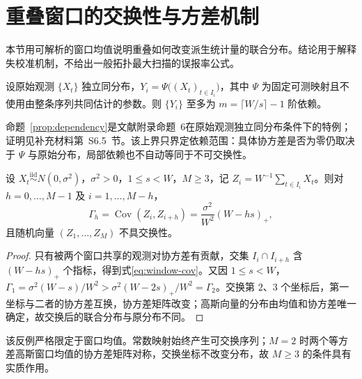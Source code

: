 \section{重叠窗口的交换性与方差机制}\label{sec:theory}

本节用可解析的窗口均值说明重叠如何改变派生统计量的联合分布。结论用于解释失校准机制，不给出一般拓扑最大扫描的误报率公式。

\begin{proposition}[局部映射的有限依赖范围]\label{prop:dependency}
设原始观测 $\{X_t\}$ 独立同分布，$Y_i=\Psi\bigl((X_t)_{t\in I_i}\bigr)$，其中 $\Psi$ 为固定可测映射且不使用由整条序列共同估计的参数。则 $\{Y_i\}$ 至多为 $m=\lceil W/s\rceil-1$ 阶依赖。
\end{proposition}

命题~\ref{prop:dependency}是文献\cite{NieYue2026}附录命题~6在原始观测独立同分布条件下的特例；证明见补充材料第~S6.5~节。该上界只界定依赖范围：具体协方差是否为零仍取决于 $\Psi$ 与原始分布，局部依赖也不自动等同于不可交换性。

\begin{proposition}[高斯窗口均值的非交换性]\label{prop:counterexample}
设 $X_t\overset{\mathrm{iid}}{\sim}N(0,\sigma^2)$，$\sigma^2>0$，$1\le s<W$，$M\ge3$，记 $Z_i=W^{-1}\sum_{t\in I_i}X_t$。则对 $h=0,\ldots,M-1$ 及 $i=1,\ldots,M-h$，
\begin{equation}\label{eq:window-cov}
 \Gamma_h=\operatorname{Cov}(Z_i,Z_{i+h})
 =\frac{\sigma^2}{W^2}(W-hs)_+ ,
\end{equation}
且随机向量 $(Z_1,\ldots,Z_M)$ 不具交换性。
\end{proposition}

\begin{proof}
只有被两个窗口共享的观测对协方差有贡献，交集 $I_i\cap I_{i+h}$ 含 $(W-hs)_+$ 个指标，得到式\eqref{eq:window-cov}。又因 $1\le s<W$，
$\Gamma_1=\sigma^2(W-s)/W^2>\sigma^2(W-2s)_+/W^2=\Gamma_2$。交换第 $2$、$3$ 个坐标后，第一坐标与二者的协方差互换，协方差矩阵改变；高斯向量的分布由均值和协方差唯一确定，故交换后的联合分布与原分布不同。
\end{proof}

\begin{remark}
该反例严格限定于窗口均值。常数映射始终产生可交换序列；$M=2$ 时两个等方差高斯窗口均值的协方差矩阵对称，交换坐标不改变分布，故 $M\ge3$ 的条件具有实质作用。
\end{remark}


